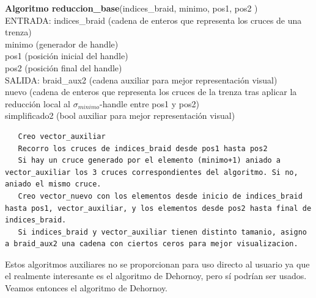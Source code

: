 \begin{alg}
	\textbf{Algoritmo reduccion\_base}(indices\_braid, minimo, pos1, pos2 )\\
	ENTRADA: indices\_braid (cadena de enteros que representa los cruces de una trenza)\\
	\hspace*{2.2cm} minimo (generador de handle) \\
	\hspace*{2.2cm} pos1 (posición inicial del handle) \\
	\hspace*{2.2cm} pos2 (posición final del handle)\\
	SALIDA: \hspace{0.4cm} braid\_aux2 (cadena auxiliar para mejor representación visual) \\
	\hspace*{2.2cm} nuevo (cadena de enteros que representa los cruces de la trenza tras aplicar la reducción local al $\sigma_{minimo}$-handle entre pos1 y pos2)\\
	\hspace*{2.2cm} simplificado2 (bool auxiliar para mejor representación visual)
	
\begin{lstlisting}
   Creo vector_auxiliar
   Recorro los cruces de indices_braid desde pos1 hasta pos2
   Si hay un cruce generado por el elemento (minimo+1) aniado a vector_auxiliar los 3 cruces correspondientes del algoritmo. Si no, aniado el mismo cruce. 
   Creo vector_nuevo con los elementos desde inicio de indices_braid hasta pos1, vector_auxiliar, y los elementos desde pos2 hasta final de indices_braid.
   Si indices_braid y vector_auxiliar tienen distinto tamanio, asigno a braid_aux2 una cadena con ciertos ceros para mejor visualizacion.
\end{lstlisting}
\end{alg}


Estos algoritmos auxiliares no se proporcionan para uso directo al usuario ya que el realmente interesante es el algoritmo de Dehornoy, pero sí podrían ser usados. Veamos entonces el algoritmo de Dehornoy.\\

